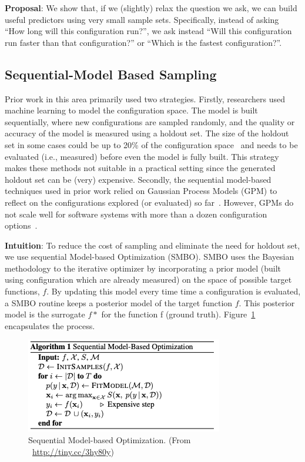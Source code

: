 \noindent\textbf{Proposal}: 
We show that, if we (slightly) relax the question
we ask, we can build useful predictors using very small sample sets.
Specifically, instead of asking ``How long will this configuration
run?'', we ask instead ``Will this configuration run faster than that
configuration?'' or ``Which is the fastest configuration?''.


\subsection{Sequential-Model Based Sampling}
Prior work in this area primarily used two strategies.
Firstly, researchers used machine learning to model the configuration
space. The model is built sequentially, where new
configurations are sampled randomly, and the quality or
accuracy of the model is measured using a holdout set. The
size of the holdout set in some cases could be up to 20\% of
the configuration space~\cite{nair2017using} and needs to be evaluated (i.e.,
measured) before even the model is fully built. This strategy
makes these methods not suitable in a practical setting since
the generated holdout set can be (very) expensive. Secondly,
the sequential model-based techniques used in prior work
relied on Gaussian Process Models (GPM) to reflect on the
configurations explored (or evaluated) so far~\cite{zuluaga2016varepsilon}. However,
GPMs do not scale well for software systems with more than
a dozen configuration options~\cite{wang2016bayesian}.



\noindent\textbf{Intuition}: 
To reduce the cost of sampling and eliminate the need for holdout set, we use sequential Model-based Optimization (SMBO). SMBO uses the Bayesian methodology to the iterative optimizer by incorporating a prior model (built using configuration which are already measured) on the space of possible target functions, $f$. By updating this model every time time a configuration is evaluated, a SMBO routine keeps a posterior model of the target function $f$. This posterior model is the surrogate $f*$ for the function f (ground truth). Figure~\ref{fig:chap1_smbo} encapsulates the process.

\begin{figure}[!htbp]
    \centering
    \includegraphics[width=0.8\linewidth]{Chapter-Introduction/Figures/bayesian_opt.png}
    \caption{Sequential Model-based Optimization. (From ~\url{http://tiny.cc/3hy80y})}
    \label{fig:chap1_smbo}
\end{figure}

